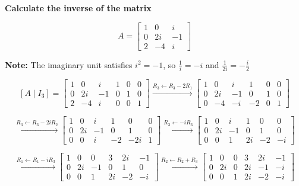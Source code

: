 \item \textbf{Calculate the inverse of the matrix}

$$
A=
\begin{bmatrix}
    1 & 0 & i\\
    0 & 2i & -1\\
    2 & -4 & i
\end{bmatrix}
$$

\begin{answer}
\end{answer}

\begin{answer}
    {\color{red}
    \textbf{Note:} The imaginary unit satisfies
    $i^2=-1$, so $\frac{1}{i}=-i$ and
    $\frac{1}{2i}=-\frac{i}{2}$
    }

    $$
    [A\mid I_3]=
    \left[
    \begin{array}{ccc|ccc}
        1 & 0 & i & 1 & 0 & 0\\
        0 & 2i & -1 & 0 & 1 & 0\\
        2 & -4 & i & 0 & 0 & 1
    \end{array}
    \right]
    \xrightarrow{R_3\leftarrow R_3-2R_1}
    \left[
    \begin{array}{ccc|ccc}
        1 & 0 & i & 1 & 0 & 0\\
        0 & 2i & -1 & 0 & 1 & 0\\
        0 & -4 & -i & -2 & 0 & 1
    \end{array}
    \right]
    $$

    $$
    \xrightarrow{R_3\leftarrow R_3-2iR_2}
    \left[
    \begin{array}{ccc|ccc}
        1 & 0 & i & 1 & 0 & 0\\
        0 & 2i & -1 & 0 & 1 & 0\\
        0 & 0 & i & -2 & -2i & 1
    \end{array}
    \right]
    \xrightarrow{R_3\leftarrow-iR_3}
    \left[
    \begin{array}{ccc|ccc}
        1 & 0 & i & 1 & 0 & 0\\
        0 & 2i & -1 & 0 & 1 & 0\\
        0 & 0 & 1 & 2i & -2 & -i
    \end{array}
    \right]
    $$

    $$
    \xrightarrow{R_1\leftarrow R_1-iR_3}
    \left[
    \begin{array}{ccc|ccc}
        1 & 0 & 0 & 3 & 2i & -1\\
        0 & 2i & -1 & 0 & 1 & 0\\
        0 & 0 & 1 & 2i & -2 & -i
    \end{array}
    \right]
    \xrightarrow{R_2\leftarrow R_2+R_3}
    \left[
    \begin{array}{ccc|ccc}
        1 & 0 & 0 & 3 & 2i & -1\\
        0 & 2i & 0 & 2i & -1 & -i\\
        0 & 0 & 1 & 2i & -2 & -i
    \end{array}
    \right]
    $$


\end{answer}

